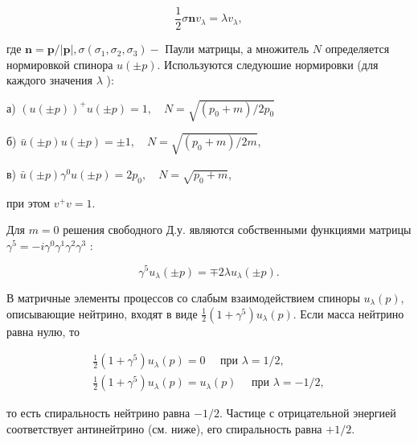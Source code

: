 \documentclass[10pt]{article}
\begin{document}
\[

\frac{1}{2} \sigma \boldsymbol{n} v_{\lambda}=\lambda v_{\lambda},

\]



где $\boldsymbol{n}=\boldsymbol{p} /|\boldsymbol{p}|, \sigma\left(\sigma_{1}, \sigma_{2}, \sigma_{3}\right)-$ Паули матрицы, а множитель $N$ определяется нормировкой спинора $u( \pm p)$. Используются следуюшие нормировки (для каждого значения $\lambda$ ):



а) $(u( \pm p))^{+} u( \pm p)=1, \quad N=\sqrt{\left(p_{0}+m\right) / 2 p_{0}}$



б) $\bar{u}( \pm p) u( \pm p)= \pm 1, \quad N=\sqrt{\left(p_{0}+m\right) / 2 m}$,



в) $\bar{u}( \pm p) \gamma^{0} u( \pm p)=2 p_{0}, \quad N=\sqrt{p_{0}+m}$,



при этом $v^{+} v=1$.



Для $m=0$ решения свободного Д.у. являются собственными функциями матрицы $\gamma^{5}=-i \gamma^{0} \gamma^{1} \gamma^{2} \gamma^{3}$ :



\[

\gamma^{5} u_{\lambda}( \pm p)=\mp 2 \lambda u_{\lambda}( \pm p) .

\]



В матричные элементы процессов со слабым взаимодействием спиноры $u_{\lambda}(p)$, описывающие нейтрино, входят в виде $\frac{1}{2}\left(1+\gamma^{5}\right) u_{\lambda}(p)$. Если масса нейтрино равна нулю, то



\[

\begin{gathered}

\frac{1}{2}\left(1+\gamma^{5}\right) u_{\lambda}(p)=0 \quad \text { при } \lambda=1 / 2, \\

\frac{1}{2}\left(1+\gamma^{5}\right) u_{\lambda}(p)=u_{\lambda}(p) \quad \text { при } \lambda=-1 / 2,

\end{gathered}

\]



то есть спиральность нейтрино равна $-1 / 2$. Частице с отрицательной энергией соответствует антинейтрино (см. ниже), его спиральность равна $+1 / 2$.
\end{document}

